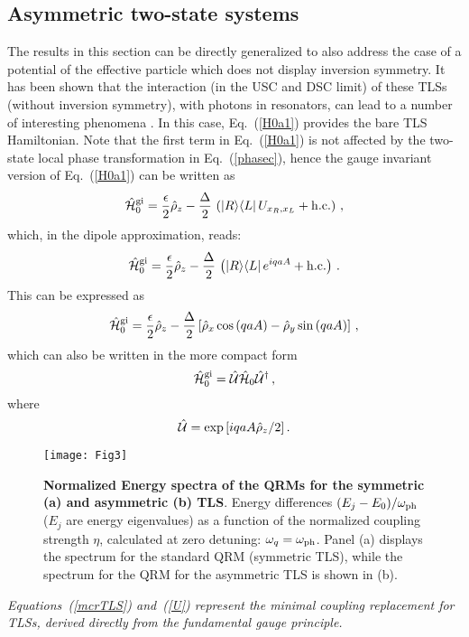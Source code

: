 \documentclass[aps,pra,reprint, superscriptaddress,amsmath,showpacs,longbibliography]{revtex4-2}
\renewcommand{\eqref}[1]{\mbox{Eq.~(\ref{#1})}}
\newcommand{\be}{\begin{equation}}
\newcommand{\ee}{\end{equation}}
\begin{document}
\subsection{Asymmetric two-state systems}
The results in this section can be directly generalized to also address the case of a potential of the effective particle which does not display inversion symmetry.
It has been shown that the interaction (in the USC and DSC limit) of these TLSs (without inversion symmetry), with photons in resonators, can lead to a number of  interesting phenomena \cite{Niemczyk2010, Ridolfo2012, Garziano2015, Garziano2016,Yoshihara2017,Kockum2017a, Stassi2017}.
In this
case, \eqref{H0a1} provides the bare TLS Hamiltonian.
Note that the first term in \eqref{H0a1} is not affected by the two-state local phase transformation in \eqref{phasec}, hence the gauge invariant version of \eqref{H0a1} can be written as
\be\label{HLa1}
\hat {\cal H}^{\rm gi}_0 = \frac{\epsilon}{2} \hat \rho_z -  \frac{\Delta}{2}\, \left(|R \rangle \langle L|\, U_{x_R, x_L} + {\rm h. c.}\right)\, ,
\ee
which, in the dipole approximation, reads:
\be\label{HLaa}
\hat {\cal H}^{\rm gi}_0 = \frac{\epsilon}{2} \hat \rho_z  - \frac{\Delta}{2}\, \left(|R \rangle \langle L|\, e^{i q a A} + {\rm h. c.}\right)\, .
\ee
{This} can be expressed as
\be\label{as1}
\hat {\cal H}^{\rm gi}_0 = \frac{\epsilon}{2} \hat \rho_z - \frac{\Delta}{2} \left[ \hat \rho_x \cos{(q a  A)} -  \hat \rho_y \sin{(q a  A)}\right]\,  ,
\ee
which can also be written in the more compact form
\be\label{mcrTLS}
\hat {\cal H}^{\rm gi}_0 = \hat {\cal U} \hat {\cal H}_0 \hat {\cal U}^\dag\, ,
\ee
where
\be\label{U}
\hat {\cal U} = \exp{\left[ i q a A \hat \rho_z /2\right]}\, .
\ee

\begin{figure}[htpb]  
	\centering
	\texttt{[image: Fig3]}  
	\caption{{\bf Normalized Energy spectra of the QRMs for the symmetric (a) and asymmetric (b) TLS}. Energy  differences  $(E_j - E_0)/\omega_{\rm ph}$ ($E_j$ are energy eigenvalues) as a function of the normalized coupling strength $\eta$, calculated at zero detuning: $\omega_q = \omega_{\rm ph}$. Panel (a) displays the spectrum for the standard QRM (symmetric TLS), while the spectrum for the QRM for the asymmetric TLS is shown in (b).}
	\label{fig3}
\end{figure}
{\em Equations~(\ref{mcrTLS}) and~(\ref{U})
represent the minimal coupling replacement for TLSs, derived directly from the fundamental gauge principle.}
\end{document}
